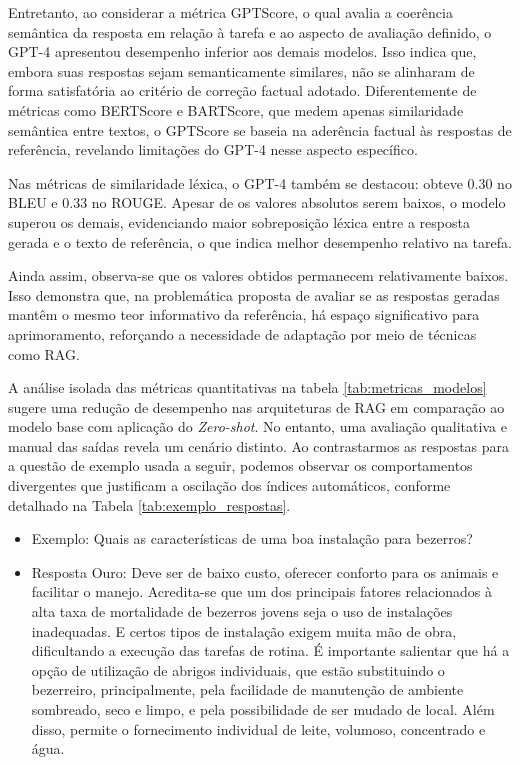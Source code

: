 Entretanto, ao considerar a métrica GPTScore, o qual avalia a coerência semântica da resposta em relação à tarefa e ao aspecto de avaliação definido, o GPT-4 apresentou desempenho inferior aos demais modelos. Isso indica que, embora suas respostas sejam semanticamente similares, não se alinharam de forma satisfatória ao critério de correção factual adotado. Diferentemente de métricas como BERTScore e BARTScore, que medem apenas similaridade semântica entre textos, o GPTScore se baseia na aderência factual às respostas de referência, revelando limitações do GPT-4 nesse aspecto específico.

Nas métricas de similaridade léxica, o GPT-4 também se destacou: obteve 0.30 no BLEU e 0.33 no ROUGE. Apesar de os valores absolutos serem baixos, o modelo superou os demais, evidenciando maior sobreposição léxica entre a resposta gerada e o texto de referência, o que indica melhor desempenho relativo na tarefa.

Ainda assim, observa-se que os valores obtidos permanecem relativamente baixos. Isso demonstra que, na problemática proposta de avaliar se as respostas geradas mantêm o mesmo teor informativo da referência, há espaço significativo para aprimoramento, reforçando a necessidade de adaptação por meio de técnicas como RAG.




A análise isolada das métricas quantitativas na tabela \ref{tab:metricas_modelos} sugere uma redução de desempenho nas arquiteturas de RAG em comparação ao modelo base com aplicação do \textit{Zero-shot}. No entanto, uma avaliação qualitativa e manual das saídas revela um cenário distinto. Ao contrastarmos as respostas para a questão de exemplo usada a seguir, podemos observar os comportamentos divergentes que justificam a oscilação dos índices automáticos, conforme detalhado na Tabela \ref{tab:exemplo_respostas}.

\begin{itemize}
    \item{Exemplo}: Quais as características de uma boa instalação para bezerros?
    
    \item{Resposta Ouro}: Deve ser de baixo custo, oferecer conforto para os animais e facilitar o manejo. Acredita-se que um dos principais fatores relacionados à alta taxa de mortalidade de bezerros jovens seja o uso de instalações inadequadas. E certos tipos de instalação exigem muita mão de obra, dificultando a execução das tarefas de rotina. É importante salientar que há a opção de utilização de abrigos individuais, que estão substituindo o bezerreiro, principalmente, pela facilidade de manutenção de ambiente sombreado, seco e limpo, e pela possibilidade de ser mudado de local. Além disso, permite o fornecimento individual de leite, volumoso, concentrado e água.
\end{itemize}

